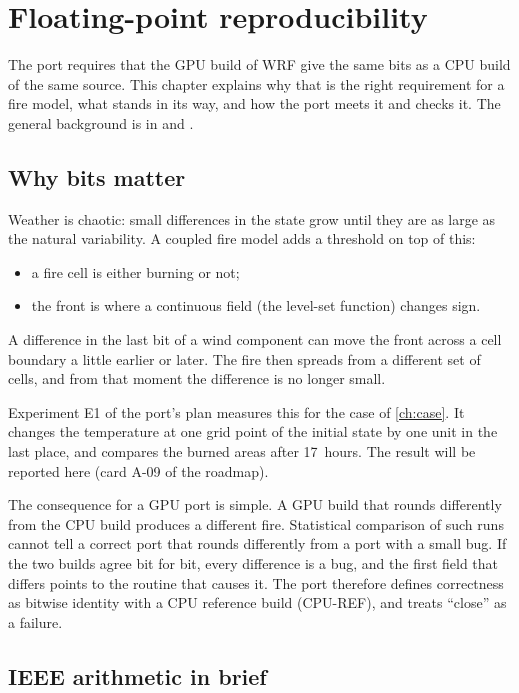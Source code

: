 \chapter{Floating-point reproducibility}\label{ch:repro}

The port requires that the GPU build of WRF give the same bits as a CPU build of the same source. This chapter
explains why that is the right requirement for a fire model, what stands in its way, and how the port meets it and
checks it. The general background is in \citet{goldberg1991} and \citet{muller2018}.

\section{Why bits matter}

Weather is chaotic: small differences in the state grow until they are as large as the natural variability. A
coupled fire model adds a threshold on top of this:
\begin{itemize}
  \item a fire cell is either burning or not;
  \item the front is where a continuous field (the level-set function) changes sign.
\end{itemize}
A difference in the last bit of a wind component can move the front across a cell boundary a little earlier or
later. The fire then spreads from a different set of cells, and from that moment the difference is no longer
small.

Experiment E1 of the port's plan measures this for the case of \cref{ch:case}. It changes the temperature at one
grid point of the initial state by one unit in the last place, and compares the burned areas after 17~hours. The
result will be reported here (card A-09 of the roadmap).

The consequence for a GPU port is simple. A GPU build that rounds differently from the CPU build produces a
different fire. Statistical comparison of such runs cannot tell a correct port that rounds differently from a port
with a small bug. If the two builds agree bit for bit, every difference is a bug, and the first field that differs
points to the routine that causes it. The port therefore defines correctness as bitwise identity with a CPU
reference build (CPU-REF), and treats ``close'' as a failure.

\section{IEEE arithmetic in brief}

